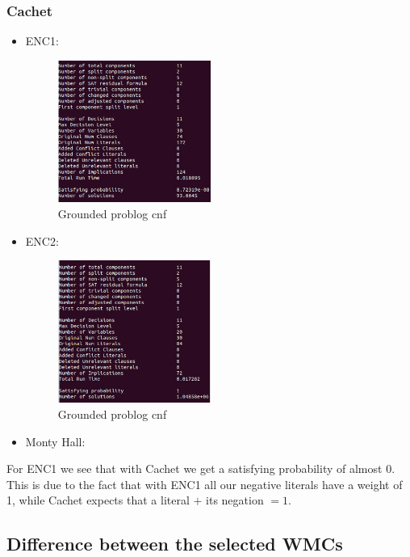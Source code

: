 \subsubsection{Cachet}
\begin{itemize}
	\item ENC1: 
\begin{figure}[H]
\begin{center}
  \includegraphics[width=5cm]{cachet-ENC1.png}
  \caption{Grounded problog cnf}
\end{center}
\end{figure}
	\item ENC2:
\begin{figure}[H]
\begin{center}
  \includegraphics[width=5cm]{cachet-ENC2.png}
  \caption{Grounded problog cnf}
\end{center}
\end{figure}
	\item Monty Hall:
\end{itemize}
For ENC1 we see that with Cachet we get a satisfying probability of almost $0$. This is due to the fact that with ENC1 all our negative literals have a weight of 1, while Cachet expects that a literal $+$ its negation $= 1$. 
\subsection{Difference between the selected WMCs}

